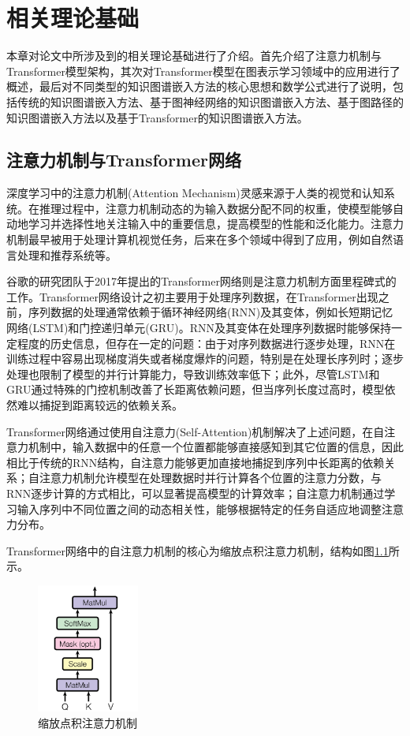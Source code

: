 \chapter{相关理论基础}
本章对论文中所涉及到的相关理论基础进行了介绍。首先介绍了注意力机制与Transformer模型架构，其次对Transformer模型在图表示学习领域中的应用进行了概述，最后对不同类型的知识图谱嵌入方法的核心思想和数学公式进行了说明，包括传统的知识图谱嵌入方法、基于图神经网络的知识图谱嵌入方法、基于图路径的知识图谱嵌入方法以及基于Transformer的知识图谱嵌入方法。

\section{注意力机制与Transformer网络}
深度学习中的注意力机制(Attention Mechanism)灵感来源于人类的视觉和认知系统。在推理过程中，注意力机制动态的为输入数据分配不同的权重，使模型能够自动地学习并选择性地关注输入中的重要信息，提高模型的性能和泛化能力。注意力机制最早被用于处理计算机视觉任务，后来在多个领域中得到了应用，例如自然语言处理和推荐系统等。

谷歌的研究团队于2017年提出的Transformer网络则是注意力机制方面里程碑式的工作。Transformer网络设计之初主要用于处理序列数据，在Transformer出现之前，序列数据的处理通常依赖于循环神经网络(RNN)及其变体，例如长短期记忆网络(LSTM)和门控递归单元(GRU)。RNN及其变体在处理序列数据时能够保持一定程度的历史信息，但存在一定的问题：由于对序列数据进行逐步处理，RNN在训练过程中容易出现梯度消失或者梯度爆炸的问题，特别是在处理长序列时；逐步处理也限制了模型的并行计算能力，导致训练效率低下；此外，尽管LSTM和GRU通过特殊的门控机制改善了长距离依赖问题，但当序列长度过高时，模型依然难以捕捉到距离较远的依赖关系。

Transformer网络通过使用自注意力(Self-Attention)机制解决了上述问题，在自注意力机制中，输入数据中的任意一个位置都能够直接感知到其它位置的信息，因此相比于传统的RNN结构，自注意力能够更加直接地捕捉到序列中长距离的依赖关系；自注意力机制允许模型在处理数据时并行计算各个位置的注意力分数，与RNN逐步计算的方式相比，可以显著提高模型的计算效率；自注意力机制通过学习输入序列中不同位置之间的动态相关性，能够根据特定的任务自适应地调整注意力分布。

Transformer网络中的自注意力机制的核心为缩放点积注意力机制，结构如图\ref{DotProductAttention}所示。
\begin{figure}[htbp]
  \centerline{\includegraphics[width=0.30\textwidth]{pic/DotProductAttention.png}}
  \caption{缩放点积注意力机制}
  \label{DotProductAttention}
\end{figure}


